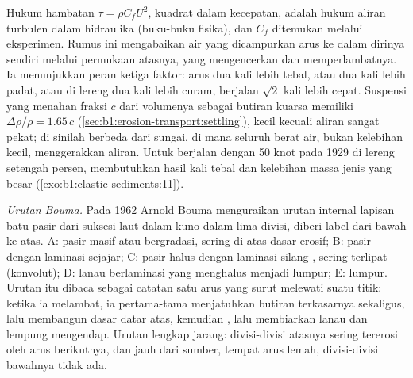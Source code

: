 Hukum hambatan $\tau = \rho C_f U^2$, kuadrat dalam kecepatan, adalah hukum aliran turbulen dalam hidraulika (buku-buku fisika), dan $C_f$ ditemukan melalui eksperimen. Rumus ini mengabaikan air yang dicampurkan arus ke dalam dirinya sendiri melalui permukaan atasnya, yang mengencerkan dan memperlambatnya. Ia menunjukkan peran ketiga faktor: arus dua kali lebih tebal, atau dua kali lebih padat, atau di lereng dua kali lebih curam, berjalan $\sqrt 2$ kali lebih cepat. Suspensi yang menahan fraksi $c$ dari volumenya sebagai butiran kuarsa memiliki $\Delta\rho/\rho = 1.65\,c$
(\cref{sec:b1:erosion-transport:settling}), kecil kecuali aliran sangat pekat; di sinilah  berbeda dari sungai, di mana seluruh berat air, bukan kelebihan kecil, menggerakkan aliran. Untuk berjalan dengan 50 knot pada 1929 di lereng setengah persen,  membutuhkan hasil kali tebal dan kelebihan massa jenis yang besar (\cref{exo:b1:clastic-sediments:11}).

\emph{Urutan Bouma.} Pada 1962 Arnold Bouma menguraikan urutan internal lapisan batu pasir dari suksesi laut dalam kuno dalam lima divisi, diberi label dari bawah ke atas. A: pasir masif atau bergradasi, sering di atas dasar erosif; B: pasir dengan laminasi sejajar; C: pasir halus dengan laminasi silang , sering terlipat (konvolut); D: lanau berlaminasi yang menghalus menjadi lumpur; E: lumpur. Urutan itu dibaca sebagai catatan satu arus yang surut melewati suatu titik: ketika ia melambat, ia pertama-tama menjatuhkan butiran terkasarnya sekaligus, lalu membangun dasar datar atas, kemudian , lalu membiarkan lanau dan lempung mengendap. Urutan lengkap jarang: divisi-divisi atasnya sering tererosi oleh arus berikutnya, dan jauh dari sumber, tempat arus lemah, divisi-divisi bawahnya tidak ada.

